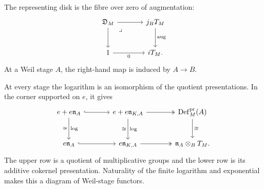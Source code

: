 \documentclass[11pt,a4paper]{article}
\numberwithin{algorithm}{section}
\numberwithin{equation}{section}
\theoremstyle{definition}
\theoremstyle{remark}
\theoremstyle{plain}
\theoremstyle{definition}
\theoremstyle{plain}
\begin{document}
The representing disk is the fibre over zero of augmentation:
\[
\begin{tikzcd}[column sep=large,row sep=large]
 \mathfrak D_M \arrow[r] \arrow[d]
   \arrow[dr,phantom,"\lrcorner",very near start]
   & j_BT_M \arrow[d,"{\operatorname{aug}}"]\\
 1 \arrow[r,"{0}"'] & iT_M .
\end{tikzcd}
\]
At a Weil stage $A$, the right-hand map is induced by $A\to B$.


At every stage the logarithm is an isomorphism of the quotient
presentations.  In the corner supported on $e$, it gives
\begin{equation}\label{eq:cat-logarithmic-quotient}
\begin{tikzcd}[column sep=large,row sep=large]
 e+e\mathfrak n_A \arrow[r,hook] \arrow[d,"{\log}","{\cong}"']
   & e+e\mathfrak n_{K,A} \arrow[r,two heads]
       \arrow[d,"{\log}","{\cong}"']
   & \operatorname{Def}^{\mathrm{pr}}_M(A) \arrow[d,"{\cong}"]\\
 e\mathfrak n_A \arrow[r,hook]
   & e\mathfrak n_{K,A} \arrow[r,two heads]
   & \mathfrak n_A\otimes_BT_M .
\end{tikzcd}
\end{equation}
The upper row is a quotient of multiplicative groups and the lower
row is its additive cokernel presentation.  Naturality of the finite
logarithm and exponential makes this a diagram of Weil-stage functors.
\end{document}
